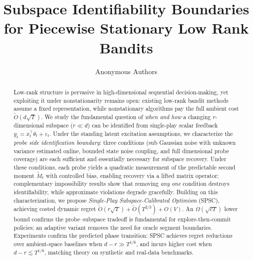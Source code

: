 \documentclass{article}
\title{Subspace Identifiability Boundaries for Piecewise Stationary Low Rank Bandits}
\author{
  Anonymous Authors
}
\begin{document}
\maketitle


\begin{abstract}

  Low-rank structure is pervasive in high-dimensional sequential decision-making, yet exploiting it under nonstationarity remains
  open: existing low-rank bandit methods assume a fixed representation, while nonstationary algorithms pay the full ambient cost
  $\widetilde{O}(d\sqrt{T})$.
  We study the fundamental question of \emph{when and how} a changing $r$-dimensional subspace ($r \ll d$) can be identified from
  single-play scalar feedback $y_t = x_t^\top\theta_t + \varepsilon_t$.
  Under the standing latent excitation assumptions, we characterize the \emph{probe side identification boundary}: three
  conditions (sub Gaussian noise with unknown variance estimated online, bounded state noise coupling, and full dimensional
  probe coverage) are each sufficient and essentially necessary for subspace recovery.
  Under these conditions, each probe yields a quadratic measurement of the predictable second moment $\widetilde{M}_t$ with controlled bias,
  enabling recovery via a lifted matrix operator; complementary impossibility results show that removing \emph{any one} condition
  destroys identifiability, while approximate violations degrade gracefully.
  Building on this characterization, we propose \emph{Single-Play Subspace-Calibrated Optimism} (SPSC), achieving costed dynamic
  regret $\widetilde{O}(r\sqrt{T}) + \widetilde{O}(T^{2/3}) + O(V)$.
    An $\Omega(\sqrt{cT})$ lower bound confirms the probe--subspace tradeoff is
  fundamental for explore-then-commit policies; an
  adaptive variant removes the need for oracle segment boundaries. Experiments confirm the predicted phase transition: SPSC achieves regret reductions over ambient-space baselines when $d - r \gg
  T^{1/6}$, and incurs higher cost when $d - r \lesssim T^{1/6}$, matching theory on synthetic and real-data benchmarks.
  \end{abstract}
\end{document}
